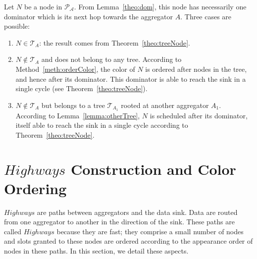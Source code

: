 \proof
Let $N$ be a node in $\mathcal{P_A}$. From Lemma~\ref{theo:dom}, this node has necessarily one dominator which is its next hop towards the aggregator $A$. Three cases are possible:
	\begin{enumerate}
	\item $N \in \mathcal{T}_A$: the result comes from Theorem~\ref{theo:treeNode}. 
	\item $N \notin \mathcal{T}_A$ and does not belong to any tree. According to Method~\ref{meth:orderColor}, the color of $N$ is ordered after nodes in the tree, and hence after its dominator. This dominator is able to reach the sink in a single cycle (see Theorem~\ref{theo:treeNode}). 
	\item $N \notin \mathcal{T}_A$ but belongs to a tree $\mathcal{T}_{A_1}$ rooted at another aggregator $A_1$. According to Lemma~\ref{lemma:otherTree}, $N$ is scheduled after its dominator, itself able to reach the sink in a single cycle according to Theorem~\ref{theo:treeNode}.
	\end{enumerate}	
\endproof

\begin{comment}
\begin{theorem}
Given a tree $\mathcal{T}_{Ag}$, any node dominated by $\mathcal{T}_{Ag}$ is able to reach the aggregator $Ag$ in one cycle.
\end{theorem}

\proof
Let $N$ any node dominated by $\mathcal{T}$. Two case are possible:
\begin{enumerate}
\item If $N \in \mathcal{T}$ or $N \in \mathcal{N}(P_{Ag})$, then the theorem is true according to Theorem~\ref{theo:oneCycleTree} and Theorem~\ref{theo:treeNode}.
\item Else, two cases are possible:
	\begin{enumerate}
	\item $N$ does not belong to any tree. This node is colored in $Step3$ of Method~\ref{meth:orderColor}, that is after all nodes in the tree $\mathcal{T}$ including its dominator. Hence the result. 
	\item $N$ belongs to a tree rooted at another aggregator $Ag_1$. As proved in Lemma~\ref{lemma:otherTree}, $N$ is scheduled before its dominator. Hence the theorem.
	\end{enumerate}
\end{enumerate}
\endproof
\end{comment}

\section{$Highways$ Construction and Color Ordering}\label{sec:highways}
$Highways$ are paths between aggregators and the data sink. Data are routed from one aggregator to another in the direction of the sink. These paths are called $Highways$ because they are fast; they comprise a small number of nodes and slots granted to these nodes are ordered according to the appearance order of nodes in these paths. In this section, we detail these aspects.


